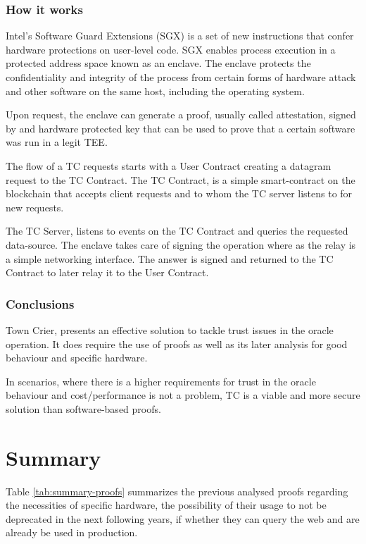 \subsubsection{How it works}

Intel’s Software Guard Extensions (SGX) is a set of new instructions that confer hardware protections on user-level code. SGX enables process execution in a protected address space known as an enclave. The enclave protects the confidentiality and integrity of the process from certain forms of hardware attack and other software on the same host, including the operating system.

Upon request, the enclave can generate a proof, usually called attestation, signed by and hardware protected key that can be used to prove that a certain software was run in a legit TEE.

The flow of a TC requests starts with a User Contract creating a datagram request to the TC Contract. The TC Contract, is a simple smart-contract on the blockchain that accepts client requests and to whom the TC server listens to for new requests.

The TC Server, listens to events on the TC Contract and queries the requested data-source. The enclave takes care of signing the operation where as the relay is a simple networking interface. The answer is signed and returned to the TC Contract to later relay it to the User Contract.



\subsubsection{Conclusions}
Town Crier, presents an effective solution to tackle trust issues in the oracle operation. It does require the use of proofs as well as its later analysis for good behaviour and specific hardware.

In scenarios, where there is a higher requirements for trust in the oracle behaviour and cost/performance is not a problem, TC is a viable and more secure solution than software-based proofs.


\section{Summary}

Table \ref{tab:summary-proofs} summarizes the previous analysed proofs regarding the necessities of specific hardware, the possibility of their usage to not be deprecated in the next following years, if whether they can query the web and are already be used in production.

